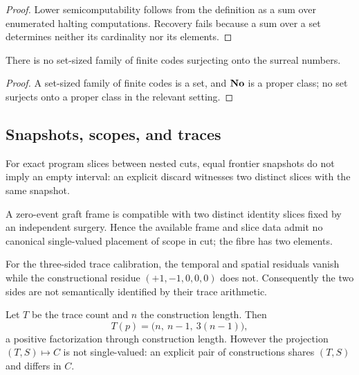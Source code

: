 \begin{proof}
Lower semicomputability follows from the definition as a sum over enumerated halting
computations.  Recovery fails because a sum over a set determines neither its cardinality
nor its elements.
\end{proof}

\begin{proposition}\label{prop:no-finite-coding}
There is no set-sized family of finite codes surjecting onto the surreal numbers.
\end{proposition}

\begin{proof}
A set-sized family of finite codes is a set, and $\mathbf{No}$ is a proper class; no set surjects
onto a proper class in the relevant setting.
\end{proof}

\subsection{Snapshots, scopes, and traces}

\begin{proposition}\label{prop:snapshot-not-empty}
For exact program slices between nested cuts, equal frontier snapshots do not imply an
empty interval: an explicit discard witnesses two distinct slices with the same snapshot.
\end{proposition}

\begin{proposition}\label{prop:zero-event-fibre}
A zero-event graft frame is compatible with two distinct identity slices fixed by an
independent surgery.  Hence the available frame and slice data admit no canonical
single-valued placement of scope in cut; the fibre has two elements.
\end{proposition}

\begin{proposition}\label{prop:trace-sides}
For the three-sided trace calibration, the temporal and spatial residuals vanish while
the constructional residue $(+1,-1,0,0,0)$ does not.  Consequently the two sides are not
semantically identified by their trace arithmetic.
\end{proposition}

\begin{proposition}
\label{prop:count-factorization}
Let $T$ be the trace count and $n$ the construction length.  Then
\[
  T(p)=\bigl(n,\ n-1,\ 3(n-1)\bigr),
\]
a positive factorization through construction length.  However the projection
$(T,S)\mapsto C$ is not single-valued: an explicit pair of constructions shares $(T,S)$
and differs in $C$.
\end{proposition}

